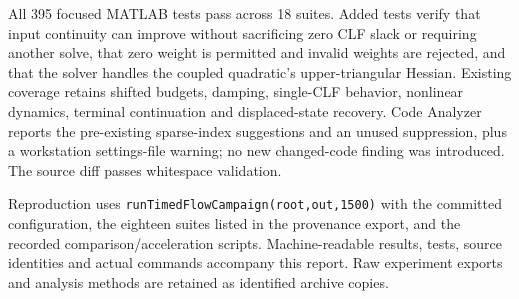\documentclass[10pt]{article}
\begin{document}
All 395 focused MATLAB tests pass across 18 suites. Added tests verify that
input continuity can improve without sacrificing zero CLF slack or requiring
another solve, that zero weight is permitted and invalid weights are rejected,
and that the solver handles the coupled quadratic's upper-triangular Hessian.
Existing coverage retains shifted budgets, damping, single-CLF behavior,
nonlinear dynamics, terminal continuation and displaced-state recovery.
Code Analyzer reports the pre-existing sparse-index suggestions and an unused
suppression, plus a workstation settings-file warning; no new changed-code
finding was introduced. The source diff passes whitespace validation.

Reproduction uses \texttt{runTimedFlowCampaign(root,out,1500)} with the committed
configuration, the eighteen suites listed in the provenance export, and the
recorded comparison/acceleration scripts. Machine-readable results, tests,
source identities and actual commands accompany this report. Raw experiment
exports and analysis methods are retained as identified archive copies.
\end{document}
